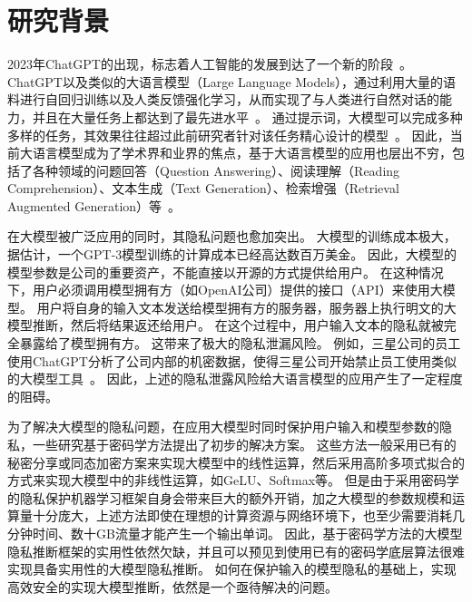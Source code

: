 \section{研究背景}
2023年ChatGPT的出现，标志着人工智能的发展到达了一个新的阶段~\cite{chatgpt}。
%
ChatGPT以及类似的大语言模型（Large Language Models），通过利用大量的语料进行自回归训练以及人类反馈强化学习，从而实现了与人类进行自然对话的能力，并且在大量任务上都达到了最先进水平~\cite{}。
%
通过提示词，大模型可以完成多种多样的任务，其效果往往超过此前研究者针对该任务精心设计的模型~\cite{}。
%
因此，当前大语言模型成为了学术界和业界的焦点，基于大语言模型的应用也层出不穷，包括了各种领域的问题回答（Question Answering）、阅读理解（Reading Comprehension）、文本生成（Text Generation）、检索增强（Retrieval Augmented Generation）等~\cite{}。


在大模型被广泛应用的同时，其隐私问题也愈加突出。
%
大模型的训练成本极大，据估计，一个GPT-3模型训练的计算成本已经高达数百万美金。
%
因此，大模型的模型参数是公司的重要资产，不能直接以开源的方式提供给用户。
%
在这种情况下，用户必须调用模型拥有方（如OpenAI公司）提供的接口（API）来使用大模型。
%
用户将自身的输入文本发送给模型拥有方的服务器，服务器上执行明文的大模型推断，然后将结果返还给用户。
%
在这个过程中，用户输入文本的隐私就被完全暴露给了模型拥有方。
%
这带来了极大的隐私泄漏风险。
%
例如，三星公司的员工使用ChatGPT分析了公司内部的机密数据，使得三星公司开始禁止员工使用类似的大模型工具~\cite{}。
%
因此，上述的隐私泄露风险给大语言模型的应用产生了一定程度的阻碍。


为了解决大模型的隐私问题，在应用大模型时同时保护用户输入和模型参数的隐私，一些研究基于密码学方法提出了初步的解决方案。
%
这些方法一般采用已有的秘密分享或同态加密方案来实现大模型中的线性运算，然后采用高阶多项式拟合的方式来实现大模型中的非线性运算，如GeLU、Softmax等。
%
但是由于采用密码学的隐私保护机器学习框架自身会带来巨大的额外开销，加之大模型的参数规模和运算量十分庞大，上述方法即使在理想的计算资源与网络环境下，也至少需要消耗几分钟时间、数十GB流量才能产生一个输出单词。
%
因此，基于密码学方法的大模型隐私推断框架的实用性依然欠缺，并且可以预见到使用已有的密码学底层算法很难实现具备实用性的大模型隐私推断。
%
如何在保护输入的模型隐私的基础上，实现高效安全的实现大模型推断，依然是一个亟待解决的问题。
